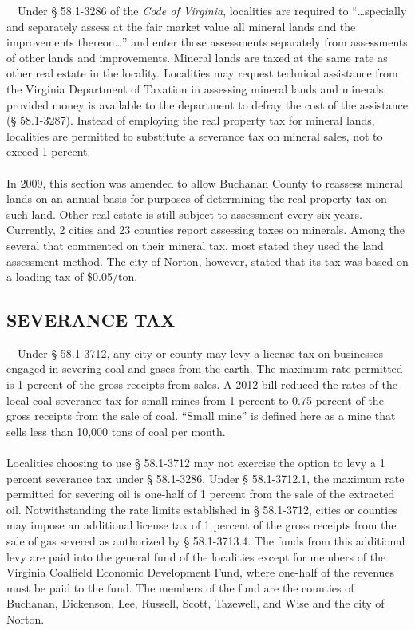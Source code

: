\documentclass[
]{book}
\begin{document}
~~Under § 58.1-3286 of the \emph{Code of Virginia}, localities are required to ``\ldots specially and separately assess at the fair market value all mineral lands and the improvements thereon\ldots{}'' and enter those assessments separately from assessments of other lands and improvements. Mineral lands are taxed at the same rate as other real estate in the locality. Localities may request technical assistance from the Virginia Department of Taxation in assessing mineral lands and minerals, provided money is available to the department to defray the cost of the assistance (§ 58.1-3287). Instead of employing the real property tax for mineral lands, localities are permitted to substitute a severance tax on mineral sales, not to exceed 1 percent.\\
~\\
\hspace*{0.333em}\hspace*{0.333em}In 2009, this section was amended to allow Buchanan County to reassess mineral lands on an annual basis for purposes of determining the real property tax on such land. Other real estate is still subject to assessment every six years. Currently, 2 cities and 23 counties report assessing taxes on minerals. Among the several that commented on their mineral tax, most stated they used the land assessment method. The city of Norton, however, stated that its tax was based on a loading tax of \$0.05/ton.\\

\hypertarget{severance-tax}{%
\subsection{SEVERANCE TAX}\label{severance-tax}}

~~Under § 58.1-3712, any city or county may levy a license tax on businesses engaged in severing coal and gases from the earth. The maximum rate permitted is 1 percent of the gross receipts from sales. A 2012 bill reduced the rates of the local coal severance tax for small mines from 1 percent to 0.75 percent of the gross receipts from the sale of coal. ``Small mine'' is defined here as a mine that sells less than 10,000 tons of coal per month.\\
~\\
\hspace*{0.333em}\hspace*{0.333em}Localities choosing to use § 58.1-3712 may not exercise the option to levy a 1 percent severance tax under § 58.1-3286. Under § 58.1-3712.1, the maximum rate permitted for severing oil is one-half of 1 percent from the sale of the extracted oil. Notwithstanding the rate limits established in § 58.1-3712, cities or counties may impose an additional license tax of 1 percent of the gross receipts from the sale of gas severed as authorized by § 58.1-3713.4. The funds from this additional levy are paid into the general fund of the localities except for members of the Virginia Coalfield Economic Development Fund, where one-half of the revenues must be paid to the fund. The members of the fund are the counties of Buchanan, Dickenson, Lee, Russell, Scott, Tazewell, and Wise and the city of Norton.\\
\end{document}
